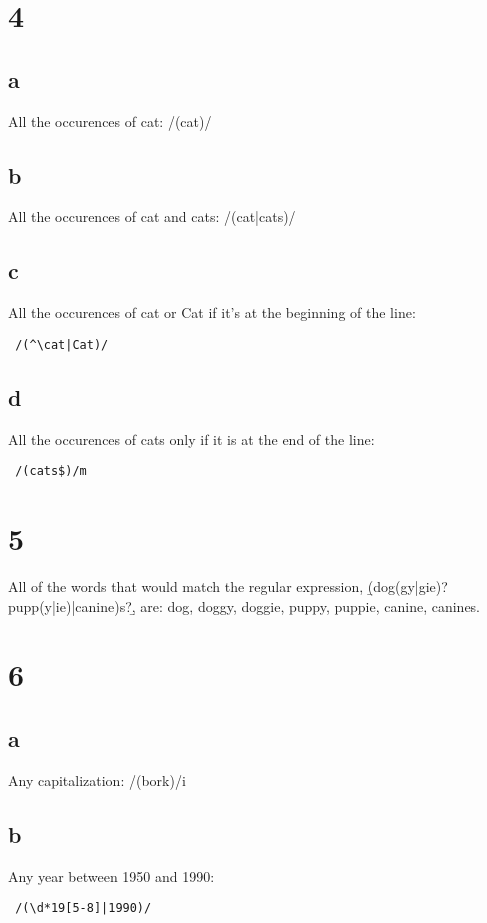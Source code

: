 \documentclass{article}
\begin{document}
\section{4}
\subsection{a}

All the occurences of cat: /(cat)/

\subsection{b}

All the occurences of cat and cats: /(cat|cats)/

\subsection{c}

All the occurences of cat or Cat if it's at the beginning of the line: \begin{verbatim} /(^\cat|Cat)/ \end{verbatim}


\subsection{d}

All the occurences of cats only if it is at the end of the line: \begin{verbatim} /(cats$)/m \end{verbatim}

\section{5}

All of the words that would match the regular expression, \b(dog(gy|gie)?pupp(y|ie)|canine)s?\b, are: dog, doggy, doggie, puppy, puppie, canine, canines.

\section{6}
\subsection{a}

Any capitalization: /(bork)/i

\subsection{b}
Any year between 1950 and 1990: \begin{verbatim} /(\d*19[5-8]|1990)/ \end{verbatim}
\end{document}
